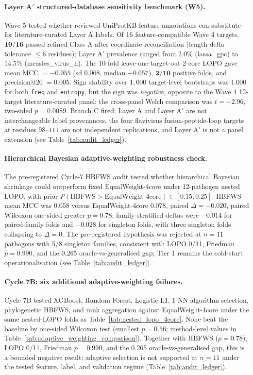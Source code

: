 \paragraph{Layer A$'$ structured-database sensitivity benchmark (W5).}
\label{para:w5_layer_a_prime}
Wave 5 tested whether reviewed UniProtKB feature annotations can substitute for literature-curated Layer A labels. Of 16 feature-compatible Wave 4 targets, $\mathbf{10/16}$ passed refined Class A after coordinate reconciliation (length-delta tolerance $\leq 6$ residues); Layer A$'$ prevalence ranged from $2.0\%$ (lassa\_gpc) to $14.5\%$ (measles\_virus\_h). The 10-fold leave-one-target-out 2-core LOPO gave mean MCC $= -0.055$ (sd $0.068$, median $-0.057$), $\mathbf{2/10}$ positive folds, and precision@20 $= 0.005$. Sign stability over $1{,}000$ target-level bootstraps was $1.000$ for both \texttt{freq} and \texttt{entropy}, but the sign was \emph{negative}, opposite to the Wave 4 12-target literature-curated panel; the cross-panel Welch comparison was $t = -2.96$, two-sided $p = 0.0089$. Branch C fired: Layer A and Layer A$'$ are not interchangeable label provenances, the four flavivirus fusion-peptide-loop targets at residues $98$--$111$ are not independent replications, and Layer A$'$ is not a panel extension (see Table~\ref{tab:audit_ledger}).

\paragraph{Hierarchical Bayesian adaptive-weighting robustness check.}
\label{para:hbfws_check}
The pre-registered Cycle-7 HBFWS audit tested whether hierarchical Bayesian shrinkage could outperform fixed EqualWeight-4core under 12-pathogen nested LOPO, with prior $P(\text{HBFWS} > \text{EqualWeight-4core}) \in [0.15, 0.25]$. HBFWS mean MCC was $0.058$ versus EqualWeight-4core $0.078$, paired $\Delta = -0.020$, paired Wilcoxon one-sided greater $p = 0.78$; family-stratified deltas were $-0.014$ for paired-family folds and $-0.028$ for singleton folds, with three singleton folds collapsing to $\Delta = 0$. The pre-registered hypothesis was rejected at $n = 11$ pathogens with 5/8 singleton families, consistent with LOPO 0/11, Friedman $p = 0.990$, and the 0.265 oracle-vs-generalised gap; Tier 1 remains the cold-start operationalisation (see Table~\ref{tab:audit_ledger}).

\paragraph{Cycle 7B: six additional adaptive-weighting failures.}
\label{para:cycle7b_comparison}
Cycle 7B tested XGBoost, Random Forest, Logistic L1, 1-NN algorithm selection, phylogenetic HBFWS, and rank aggregation against EqualWeight-4core under the same nested-LOPO folds as Table~\ref{tab:nested_lopo_4core}. None beat the baseline by one-sided Wilcoxon test (smallest $p=0.56$; method-level values in Table~\ref{tab:adaptive_weighting_comparison}). Together with HBFWS ($p=0.78$), LOPO 0/11, Friedman $p=0.990$, and the 0.265 oracle-vs-generalised gap, this is a bounded negative result: adaptive selection is not supported at $n=11$ under the tested feature, label, and validation regime (Table~\ref{tab:audit_ledger}).

